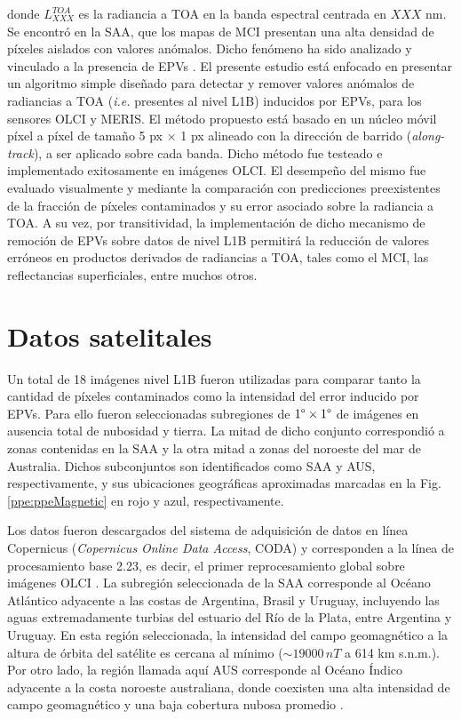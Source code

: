     \noindent
    donde $L^{TOA}_{XXX}$ es la radiancia a TOA en la banda espectral centrada en $XXX$ nm. Se encontró en la SAA, que los mapas de MCI presentan una alta densidad de píxeles aislados con valores anómalos. Dicho fenómeno ha sido analizado y vinculado a la presencia de EPVs \cite{gower2008}. El presente estudio está enfocado en presentar un algoritmo simple diseñado para detectar y remover valores anómalos de radiancias a TOA (\textit{i.e.} presentes al nivel L1B) inducidos por EPVs, para los sensores OLCI y MERIS. El método propuesto está basado en un núcleo móvil píxel a píxel de tamaño 5 px $\times$ 1 px alineado con la dirección de barrido (\textit{along-track}), a ser aplicado sobre cada banda. Dicho método fue testeado e implementado exitosamente en imágenes OLCI. El desempeño del mismo fue evaluado visualmente y mediante la comparación con predicciones preexistentes \cite{damico2015} de la fracción de píxeles contaminados y su error asociado sobre la radiancia a TOA. A su vez, por transitividad, la implementación de dicho mecanismo de remoción de EPVs sobre datos de nivel L1B permitirá la reducción de valores erróneos en productos derivados de radiancias a TOA, tales como el MCI, las reflectancias superficiales, entre muchos otros.

\section{Datos satelitales}
\label{ppe:s:satelitales}

    Un total de 18 imágenes nivel L1B fueron utilizadas para comparar tanto la cantidad de píxeles contaminados como la intensidad del error inducido por EPVs. Para ello fueron seleccionadas subregiones de $1\degree\times1\degree$ de imágenes en ausencia total de nubosidad y tierra. La mitad de dicho conjunto correspondió a zonas contenidas en la SAA y la otra mitad a zonas del noroeste del mar de Australia. Dichos subconjuntos son identificados como SAA y AUS, respectivamente, y sus ubicaciones geográficas aproximadas marcadas en la Fig. \ref{ppe:ppeMagnetic} en rojo y azul, respectivamente.
    
    Los datos fueron descargados del sistema de adquisición de datos en línea Copernicus (\textit{Copernicus Online Data Access}, CODA) y corresponden a la línea de procesamiento base 2.23, es decir, el primer reprocesamiento global sobre imágenes OLCI \cite{eumetsat}. 
    La subregión seleccionada de la SAA corresponde al Océano Atlántico adyacente a las costas de Argentina, Brasil y Uruguay, incluyendo las aguas extremadamente turbias del estuario del Río de la Plata, entre Argentina y Uruguay. En esta región seleccionada, la intensidad del campo geomagnético a la altura de órbita del satélite es cercana al mínimo ($\sim 19000 \, nT$ a 614 km s.n.m.). Por otro lado, la región llamada aquí AUS corresponde al Océano Índico adyacente a la costa noroeste australiana, donde coexisten una alta intensidad de campo geomagnético y una baja cobertura nubosa promedio \cite{esacloud}.
    
